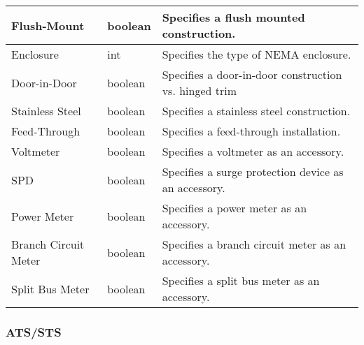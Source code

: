 \documentclass[letterpaper,10pt,english]{sphinxmanual}
\begin{document}
\begin{savenotes}
\begin{tabulary}{\linewidth}[t]{|T|T|T|}
\\
\hline
Flush-Mount
&
boolean
&
Specifies a flush mounted construction.
\\
\hline
Enclosure
&
int
&
Specifies the type of NEMA enclosure.
\\
\hline
Door-in-Door
&
boolean
&
Specifies a door-in-door construction vs. hinged trim
\\
\hline
Stainless Steel
&
boolean
&
Specifies a stainless steel construction.
\\
\hline
Feed-Through
&
boolean
&
Specifies a feed-through installation.
\\
\hline
Voltmeter
&
boolean
&
Specifies a voltmeter as an accessory.
\\
\hline
SPD
&
boolean
&
Specifies a surge protection device as an accessory.
\\
\hline
Power Meter
&
boolean
&
Specifies a power meter as an accessory.
\\
\hline
Branch Circuit Meter
&
boolean
&
Specifies a branch circuit meter as an accessory.
\\
\hline
Split Bus Meter
&
boolean
&
Specifies a split bus meter as an accessory.
\\
\hline
\end{tabulary}
\par
\sphinxattableend\end{savenotes}


\subsubsection{ATS/STS}
\label{\detokenize{docs/definitions/index-definitions:ats-sts}}\label{\detokenize{docs/definitions/index-definitions:ats-sts-definition}}
\end{document}
